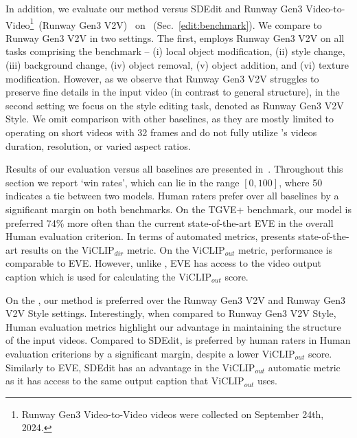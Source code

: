 In addition, we evaluate our method versus SDEdit and Runway Gen3 Video-to-Video\footnote{Runway Gen3 Video-to-Video videos were collected on September 24th, 2024.}~(Runway Gen3 V2V)~\citep{gen3} on \OursVideoEditBench~(Sec.~\ref{edit:benchmark}).
We compare to Runway Gen3 V2V in two settings.
The first, employs Runway Gen3 V2V on all tasks comprising the benchmark -- (i) local object modification, (ii) style change, (iii) background change, (iv) object removal, (v) object addition, and (vi) texture modification.
However, as we observe that Runway Gen3 V2V struggles to preserve fine details in the input video (in contrast to general structure), in the second setting we focus on the style editing task, denoted as Runway Gen3 V2V Style.
We omit comparison with other baselines, as they are mostly limited to operating on short videos with 32 frames and do not fully utilize \OursVideoEditBench's videos duration, resolution, or varied aspect ratios.

Results of our evaluation versus all baselines are presented in~.
Throughout this section we report `win rates', which can lie in the range $[0,100]$, where 50 indicates a tie between two models.
Human raters prefer \OursVideoEdit over all baselines by a significant margin on both benchmarks.
On the TGVE+ benchmark, our model is preferred 74\% more often than the current state-of-the-art EVE in the overall Human evaluation criterion.
In terms of automated metrics, \OursVideoEdit presents state-of-the-art results on the $\text{ViCLIP}_{dir}$ metric.
On the $\text{ViCLIP}_{out}$ metric, \OursVideoEdit performance is comparable to EVE.
However, unlike \OursVideoEdit, EVE has access to the video output caption which is used for calculating the $\text{ViCLIP}_{out}$ score.

On the \OursVideoEditBench, our method is preferred over the Runway Gen3 V2V and Runway Gen3 V2V Style settings.
Interestingly, when compared to Runway Gen3 V2V Style, Human evaluation metrics highlight our advantage in maintaining the structure of the input videos.
Compared to SDEdit, \OursVideoEdit is preferred by human raters in Human evaluation criterions by a significant margin, despite a lower $\text{ViCLIP}_{out}$ score.
Similarly to EVE, SDEdit has an advantage in the $\text{ViCLIP}_{out}$ automatic metric as it has access to the same output caption that $\text{ViCLIP}_{out}$ uses.


